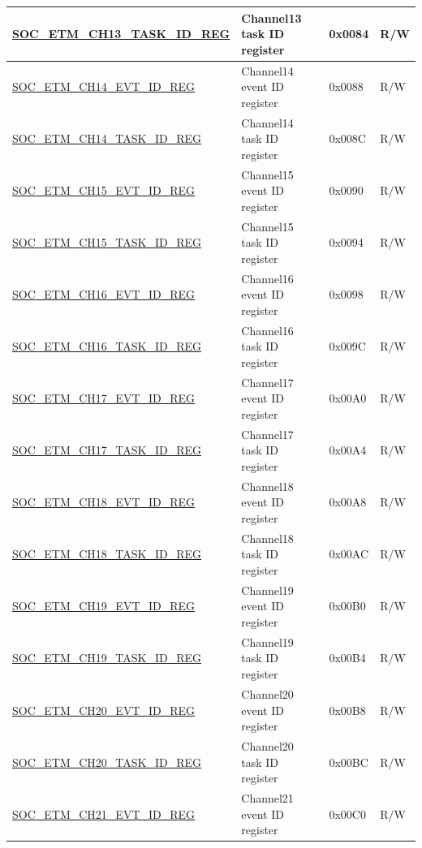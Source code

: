 \begin{longtable}{ | p{6cm} | p{6.4cm} | p{1.3cm} | p{1.8cm} | }
\hyperref[regdesc:SOCETMCH0TASKIDREG]{SOC\_ETM\_CH13\_TASK\_ID\_REG} & Channel13 task ID register & 0x0084 & R/W \\ \hline
\hyperref[regdesc:SOCETMCH0EVTIDREG]{SOC\_ETM\_CH14\_EVT\_ID\_REG} & Channel14 event ID register & 0x0088 & R/W \\ \hline
\hyperref[regdesc:SOCETMCH0TASKIDREG]{SOC\_ETM\_CH14\_TASK\_ID\_REG} & Channel14 task ID register & 0x008C & R/W \\ \hline
\hyperref[regdesc:SOCETMCH0EVTIDREG]{SOC\_ETM\_CH15\_EVT\_ID\_REG} & Channel15 event ID register & 0x0090 & R/W \\ \hline
\hyperref[regdesc:SOCETMCH0TASKIDREG]{SOC\_ETM\_CH15\_TASK\_ID\_REG} & Channel15 task ID register & 0x0094 & R/W \\ \hline
\hyperref[regdesc:SOCETMCH0EVTIDREG]{SOC\_ETM\_CH16\_EVT\_ID\_REG} & Channel16 event ID register & 0x0098 & R/W \\ \hline
\hyperref[regdesc:SOCETMCH0TASKIDREG]{SOC\_ETM\_CH16\_TASK\_ID\_REG} & Channel16 task ID register & 0x009C & R/W \\ \hline
\hyperref[regdesc:SOCETMCH0EVTIDREG]{SOC\_ETM\_CH17\_EVT\_ID\_REG} & Channel17 event ID register & 0x00A0 & R/W \\ \hline
\hyperref[regdesc:SOCETMCH0TASKIDREG]{SOC\_ETM\_CH17\_TASK\_ID\_REG} & Channel17 task ID register & 0x00A4 & R/W \\ \hline
\hyperref[regdesc:SOCETMCH0EVTIDREG]{SOC\_ETM\_CH18\_EVT\_ID\_REG} & Channel18 event ID register & 0x00A8 & R/W \\ \hline
\hyperref[regdesc:SOCETMCH0TASKIDREG]{SOC\_ETM\_CH18\_TASK\_ID\_REG} & Channel18 task ID register & 0x00AC & R/W \\ \hline
\hyperref[regdesc:SOCETMCH0EVTIDREG]{SOC\_ETM\_CH19\_EVT\_ID\_REG} & Channel19 event ID register & 0x00B0 & R/W \\ \hline
\hyperref[regdesc:SOCETMCH0TASKIDREG]{SOC\_ETM\_CH19\_TASK\_ID\_REG} & Channel19 task ID register & 0x00B4 & R/W \\ \hline
\hyperref[regdesc:SOCETMCH0EVTIDREG]{SOC\_ETM\_CH20\_EVT\_ID\_REG} & Channel20 event ID register & 0x00B8 & R/W \\ \hline
\hyperref[regdesc:SOCETMCH0TASKIDREG]{SOC\_ETM\_CH20\_TASK\_ID\_REG} & Channel20 task ID register & 0x00BC & R/W \\ \hline
\hyperref[regdesc:SOCETMCH0EVTIDREG]{SOC\_ETM\_CH21\_EVT\_ID\_REG} & Channel21 event ID register & 0x00C0 & R/W \\ \hline

\end{longtable}
